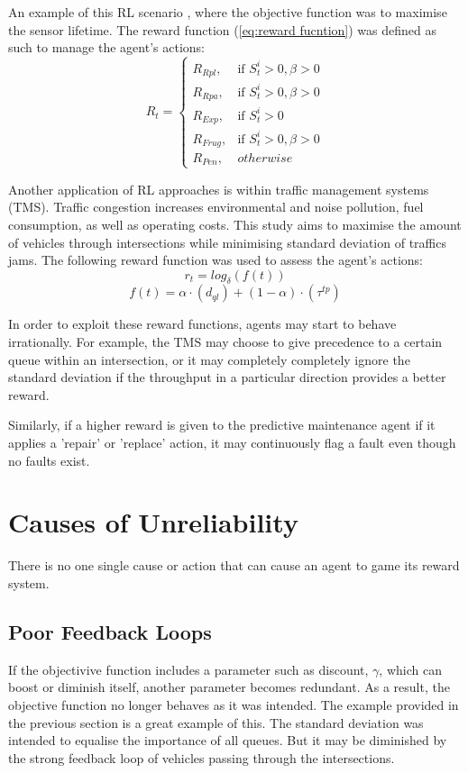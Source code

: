 \documentclass[a4paper,12pt]{report}
\begin{document}
An example of this RL scenario \cite{9221098}, where the objective function was to maximise the sensor lifetime.
The reward function (\ref{eq:reward fucntion}) was defined as such to manage the agent's actions:
\begin{equation}
    \label{eq:reward fucntion}
    R_t = \begin{cases}
        R_{Rpl}, & \text{if } S_t^i > 0, \beta > 0\\
        R_{Rpa}, & \text{if } S_t^i > 0, \beta > 0\\
        R_{Exp}, & \text{if } S_t^i > 0\\
        R_{Frug}, & \text{if } S_t^i > 0, \beta > 0\\
        R_{Pen}, & otherwise
    \end{cases}
\end{equation}

Another application of RL approaches is within traffic management systems (TMS). 
Traffic congestion increases environmental and noise pollution, fuel consumption, as well as operating costs.
This study \cite{JOO2020324} aims to maximise the amount of vehicles through intersections while minimising standard deviation of traffics jams.
The following reward function was used to assess the agent's actions:
\begin{equation}
    r_t = log_\delta(f(t))
\end{equation}
\begin{equation}
    f(t) = \alpha \cdot (d_{ql}) + (1 - \alpha)\cdot(\tau^{tp})
\end{equation}

In order to exploit these reward functions, agents may start to behave irrationally. 
For example, the TMS may choose to give precedence to a certain queue within an intersection, or it may completely completely ignore the standard deviation if the throughput in a particular direction provides a better reward.

Similarly, if a higher reward is given to the predictive maintenance agent if it applies a 'repair' or 'replace' action, it may continuously flag a fault even though no faults exist. 

\section{Causes of Unreliability}
There is no one single cause or action that can cause an agent to game its reward system.

\subsection{Poor Feedback Loops}
If the objectivive function includes a parameter such as discount, $\gamma$, which can boost or diminish itself, another parameter becomes redundant.
As a result, the objective function no longer behaves as it was intended.
The example provided in the previous section is a great example of this. The standard deviation was intended to equalise the importance of all queues.
But it may be diminished by the strong feedback loop of vehicles passing through the intersections.
\end{document}
